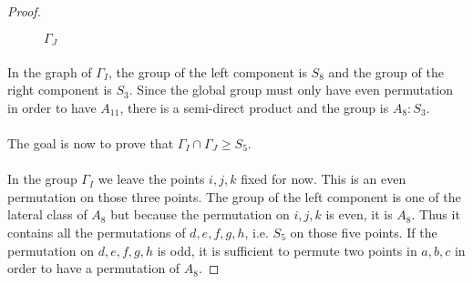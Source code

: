 \begin{proof}
\begin{figure}[H]
\begin{center}
      \caption{$\Gamma_{J}$}
    \end{center}
  \end{figure}

  \paragraph{}
  In the graph of $\Gamma_{I}$, the group of the left component is $S_8$ and the group of the right component is $S_3$. Since the global group must only have even permutation in order to have $A_{11}$, there is a semi-direct product and the group is $A_8 : S_3$.

  \paragraph{}
  The goal is now to prove that $\Gamma_{I} \cap \Gamma_{J} \ge S_5$.

  \paragraph{}
  In the group $\Gamma_{I}$ we leave the points $i,j,k$ fixed for now. This is an even permutation on those three points. The group of the left component is one of the lateral class of $A_8$ but because the permutation on $i,j,k$ is even, it is $A_8$. Thus it contains all the permutations of $d,e,f,g,h$, i.e. $S_5$ on those five points. If the permutation on $d,e,f,g,h$ is odd, it is sufficient to permute two points in $a,b,c$ in order to have a permutation of $A_8$.


\end{proof}
